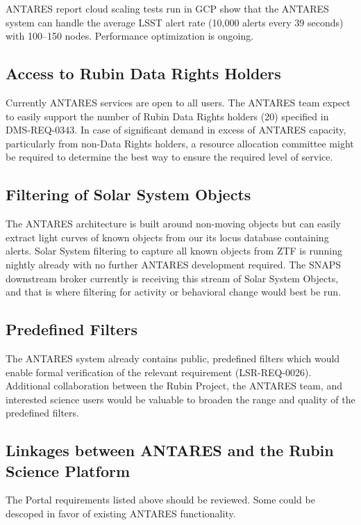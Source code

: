 \documentclass[DM,authoryear,toc]{lsstdoc}
\begin{document}
ANTARES report cloud scaling tests run in GCP show that the ANTARES system can handle the average LSST alert rate (10,000 alerts every 39 seconds) with 100--150 nodes.
Performance optimization is ongoing.

\subsection{Access to Rubin Data Rights Holders}

Currently ANTARES services are open to all users.  
The ANTARES team expect to easily support the number of Rubin Data Rights holders (20) specified in DMS-REQ-0343.
In case of significant demand in excess of ANTARES capacity, particularly from non-Data Rights holders, a resource allocation committee might be required to determine the best way to ensure the required level of service.

\subsection{Filtering of Solar System Objects}

The ANTARES architecture is built around non-moving objects but can easily extract light curves of known objects from our its locus database containing alerts. 
Solar System filtering to capture all known objects from ZTF is running nightly already with no further ANTARES development required. 
The SNAPS downstream broker currently is receiving this stream of Solar System Objects, and that is where filtering for activity or behavioral change would best be run.
\subsection{Predefined Filters}

The ANTARES system already contains public, predefined filters which would enable formal verification of the relevant requirement (LSR-REQ-0026).
Additional collaboration between the Rubin Project, the ANTARES team, and interested science users would be valuable to broaden the range and quality of the predefined filters.

\subsection{Linkages between ANTARES and the Rubin Science Platform}

The  Portal requirements listed above should be reviewed.
Some could be descoped in favor of existing ANTARES functionality.
\end{document}
